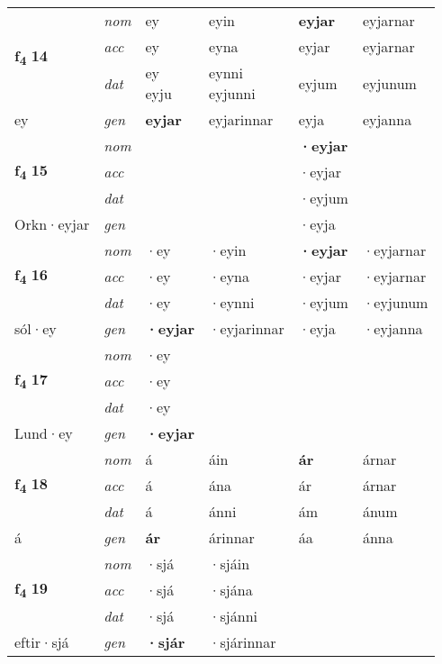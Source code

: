 \begin{longtable}[l]{X>{\footnotesize\itshape}XXXXX}
\multirow{3}{*}{{{\textbf{f{\textsubscript{4}}} \Large{\textbf{14}}}}} & nom & ey & eyin & \textbf{eyjar} & eyjarnar \\*
 & acc & ey & eyna & eyjar & eyjarnar \\*
 & dat & \specialcell{ey\\ eyju} & \specialcell{eynni\\ eyjunni} & eyjum & eyjunum \\*
 {\footnotesize{ey}} & gen & \textbf{eyjar} & eyjarinnar & eyja & eyjanna \\
\midrule

\multirow{3}{*}{{{\textbf{f{\textsubscript{4}}} \Large{\textbf{15}}}}} & nom &  &  & \textbf{·eyjar} &  \\*
 & acc &  &  & ·eyjar &  \\*
 & dat &  &  & ·eyjum &  \\*
 {\footnotesize{Orkn\allowbreak ·eyjar}} & gen & \textbf{} &  & ·eyja &  \\
\midrule

\multirow{3}{*}{{{\textbf{f{\textsubscript{4}}} \Large{\textbf{16}}}}} & nom & ·ey & ·eyin & \textbf{·eyjar} & ·eyjarnar \\*
 & acc & ·ey & ·eyna & ·eyjar & ·eyjarnar \\*
 & dat & ·ey & ·eynni & ·eyjum & ·eyjunum \\*
 {\footnotesize{sól\allowbreak ·ey}} & gen & \textbf{·eyjar} & ·eyjarinnar & ·eyja & ·eyjanna \\
\midrule

\multirow{3}{*}{{{\textbf{f{\textsubscript{4}}} \Large{\textbf{17}}}}} & nom & ·ey &  & \textbf{} &  \\*
 & acc & ·ey &  &  &  \\*
 & dat & ·ey &  &  &  \\*
 {\footnotesize{Lund\allowbreak ·ey}} & gen & \textbf{·eyjar} &  &  &  \\
\midrule

\multirow{3}{*}{{{\textbf{f{\textsubscript{4}}} \Large{\textbf{18}}}}} & nom & á & áin & \textbf{ár} & árnar \\*
 & acc & á & ána & ár & árnar \\*
 & dat & á & ánni & ám & ánum \\*
 {\footnotesize{á}} & gen & \textbf{ár} & árinnar & áa & ánna \\
\midrule

\multirow{3}{*}{{{\textbf{f{\textsubscript{4}}} \Large{\textbf{19}}}}} & nom & ·sjá & ·sjáin & \textbf{} &  \\*
 & acc & ·sjá & ·sjána &  &  \\*
 & dat & ·sjá & ·sjánni &  &  \\*
 {\footnotesize{eftir\allowbreak ·sjá}} & gen & \textbf{·sjár} & ·sjárinnar &  &  \\
\midrule


\end{longtable}
